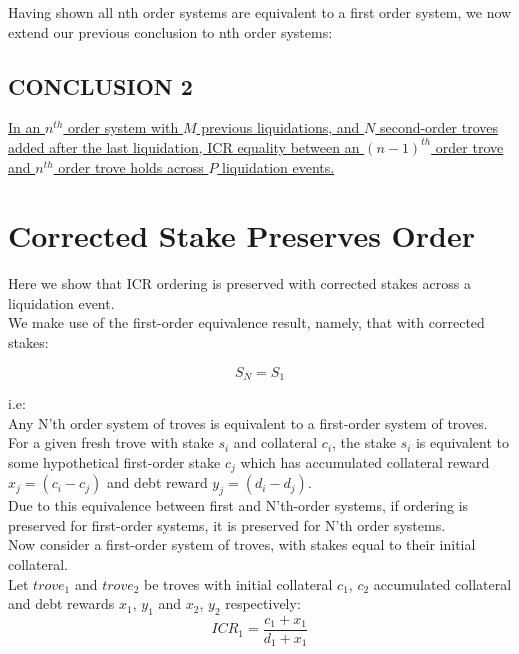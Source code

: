 \documentclass[reqno]{article}
\begin{document}
\bigskip
Having shown all nth order systems are equivalent to a first order system, we now extend our previous conclusion to nth order systems:

\subsection{CONCLUSION 2}

\uline{In an $n^{th}$ order system with $M$ previous liquidations, and $N$ second-order troves added after the last liquidation, ICR equality between an $(n-1)^{th}$ order trove and $n^{th}$ order trove holds across $P$ liquidation events.}

\section{Corrected Stake Preserves Order}
Here we show that ICR ordering is preserved with corrected stakes across a liquidation event.\\

We make use of the first-order equivalence result, namely, that with corrected stakes:

\begin{equation} 
    S_N = S_1
\end{equation}

i.e:\\

Any N’th order system of troves is equivalent to a first-order system of troves. For a given fresh trove with stake $s_i$ and collateral $c_i$, the stake $s_i$ is equivalent to some hypothetical first-order stake $c_j$ which has accumulated collateral reward $x_j = (c_i - c_j)$ and debt reward $y_j = (d_i - d_j)$.\\

Due to this equivalence between first and N’th-order systems, if ordering is preserved for first-order systems, it is preserved for N’th order systems.\\

Now consider a first-order system of troves, with stakes equal to their initial collateral.\\

Let $trove_1$ and $trove_2$ be troves with initial collateral $c_1$, $c_2$ accumulated collateral and debt rewards $x_1$, $y_1$ and $x_2$, $y_2$ respectively:\\

\begin{equation} 
    ICR_1=\frac{c_1+x_1}{d_1+x_1}
\end{equation}
\end{document}
